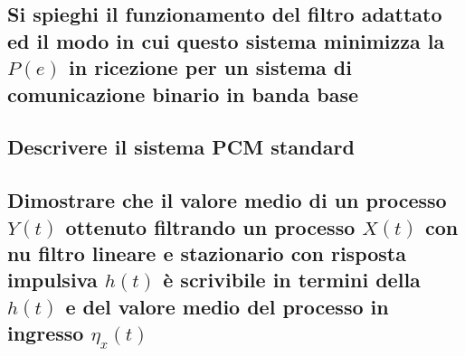 \documentclass[12pt,oneside,openany]{memoir}
\numberwithin{equation}{subsection}
\begin{document}

\subsection{Si spieghi il funzionamento del filtro adattato ed il modo in cui
questo sistema minimizza la $P(e)$ in ricezione per un sistema di comunicazione
binario in banda base}


\subsection{Descrivere il sistema PCM standard}


\subsection{Dimostrare che il valore medio di un processo $Y(t)$ ottenuto
filtrando un processo $X(t)$ con nu filtro lineare e stazionario con risposta
impulsiva $h(t)$ \`e scrivibile in termini della $h(t)$ e del valore medio del
processo in ingresso $\eta_x(t)$}

\end{document}
